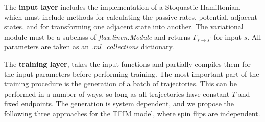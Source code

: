 The \textbf{input layer} includes the implementation of a Stoquastic Hamiltonian, which must include methods for calculating the passive rates, potential, adjacent states, and for transforming one adjacent state into another. The variational module must be a subclass of \emph{flax.linen.Module} and returns $\Gamma_{s\rightarrow s^\prime}$ for input $s$. All parameters are taken as an \emph{.ml\_collections} dictionary.

The \textbf{training layer}, takes the input functions and partially compiles them for the input parameters before performing training. The most important part of the training procedure is the generation of a batch of trajectories. This can be performed in a number of ways, so long as all trajectories have constant $T$ and fixed endpoints. The generation is system dependent, and we propose the following three approaches for the TFIM model, where spin flips are independent. 

